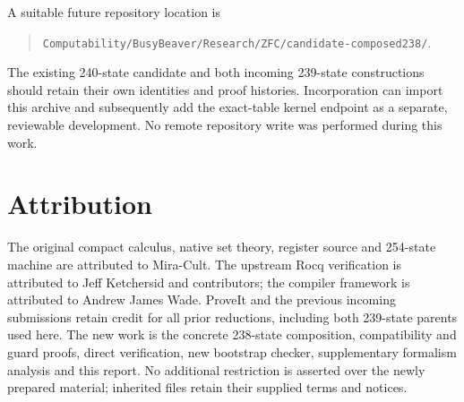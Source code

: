 \documentclass[11pt]{article}
\theoremstyle{definition}\newtheorem{definition}[theorem]{Definition}
\newcommand{\file}[1]{\nolinkurl{#1}}
\begin{document}
A suitable future repository location is
\begin{quote}\small
\file{Computability/BusyBeaver/Research/ZFC/candidate-composed238/}.
\end{quote}
The existing 240-state candidate and both incoming 239-state constructions
should retain their own identities and proof histories.  Incorporation
can import this archive and subsequently add the exact-table kernel
endpoint as a separate, reviewable development.  No remote repository
write was performed during this work.

\section*{Attribution}
The original compact calculus, native set theory, register source and
254-state machine are attributed to Mira-Cult.  The upstream Rocq
verification is attributed to Jeff Ketchersid and contributors; the
compiler framework is attributed to Andrew James Wade.  ProveIt and the
previous incoming submissions retain credit for all prior reductions,
including both 239-state parents used here.  The new work is the concrete
238-state composition, compatibility and guard proofs, direct verification,
new bootstrap checker, supplementary formalism analysis and this report.
No additional restriction is asserted over the newly prepared material;
inherited files retain their supplied terms and notices.
\end{document}
